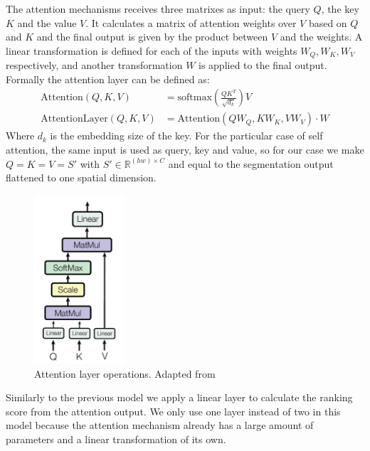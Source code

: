 The attention mechanisms receives three matrixes as input: the query $Q$, the key $K$ and the value
$V$. It calculates a matrix of attention weights over $V$ based on $Q$ and $K$ and the final output
is given by the product between $V$ and the weights. A linear transformation is defined
for each of the inputs with weights $W_Q, W_K, W_V$ respectively, and another transformation $W$
is applied to the final output. Formally the attention layer can be defined as:
\begin{align}
	\label{eq:attention}
	\text{Attention}(Q,K,V) &= \text{softmax}(\frac{QK^T}{\sqrt{d_k}})V \\
	\label{eq:attention_layer}
	\text{AttentionLayer}(Q,K,V) &=  \text{Attention}(QW_Q,KW_K,VW_V)\cdot W
\end{align}
Where $d_k$ is the embedding size of the key. For the particular case of self attention,
the same input is used as query, key and value, so for our case we make $Q=K=V=S'$ with
$S' \in \mathbb{R}^{(hw) \times C}$ and equal to the segmentation output flattened to one
spatial dimension.

\begin{figure}[ht]
	\begin{center}
	\includegraphics[width=0.3\textwidth]{./figures/attention.png}
	\caption[Attention Mechanism]{Attention layer operations. Adapted from }
	\label{fig:segrank_1}
	\end{center}
\end{figure}

Similarly to the previous model we apply a linear layer to calculate the ranking score from the attention output.
We only use one layer instead of two in this model because the attention mechanism already has a large amount of parameters and a
linear transformation of its own.

